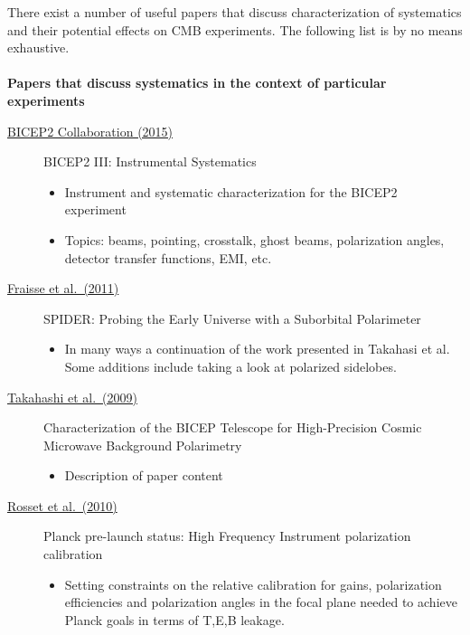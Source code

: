 There exist a number of useful papers that discuss characterization of systematics and their potential effects on CMB experiments. The following list is by no means exhaustive.
\\ \\
\textbf{Papers that discuss systematics in the context of particular experiments}
\begin{description}

\item[\href{https://arxiv.org/abs/1502.00608}{BICEP2 Collaboration (2015)}] BICEP2 III: Instrumental Systematics
\begin{itemize}[noitemsep]
\item Instrument and systematic characterization for the BICEP2 experiment
\item Topics: beams, pointing, crosstalk, ghost beams, polarization angles, detector transfer functions, EMI, etc.
\end{itemize}

\item[\href{https://arxiv.org/abs/1106.3087}{Fraisse et al.\ (2011)}] SPIDER: Probing the Early Universe with a Suborbital Polarimeter
\begin{itemize}[noitemsep]
\item In many ways a continuation of the work presented in Takahasi et al. Some additions include taking a look at polarized sidelobes.
\end{itemize}

\item[\href{https://arxiv.org/abs/0906.4069}{Takahashi et al.\ (2009)}] Characterization of the BICEP Telescope for High-Precision Cosmic Microwave Background Polarimetry
\begin{itemize}[noitemsep]
\item Description of paper content
\end{itemize}

\item[\href{https://arxiv.org/abs/1004.2595}{Rosset et al.\ (2010)}] Planck pre-launch status: High Frequency Instrument polarization calibration
\begin{itemize}[noitemsep]
\item Setting constraints on the relative calibration for gains, polarization efficiencies and polarization angles in the focal plane needed to achieve Planck goals in terms of T,E,B leakage.
\end{itemize}



\end{description}

